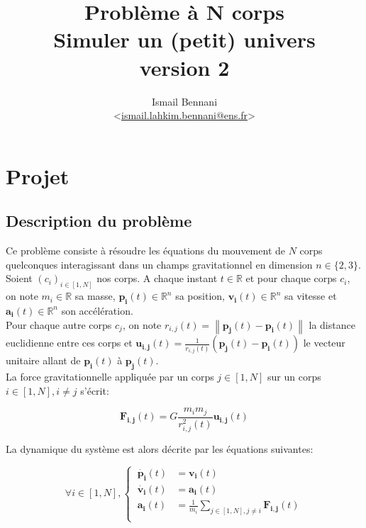 \documentclass{article}
\title{\textbf{Problème à N corps} \\
       \Large Simuler un (petit) univers\\
       \small version 2}
\author{Ismail Bennani \\
        <\href{mailto:ismail.lahkim.bennani@ens.fr}{ismail.lahkim.bennani@ens.fr}>}
\date{}
\newcommand{\norm}[1]{\left\lVert#1\right\rVert}
\newcommand{\myvec}[1]{\ensuremath{\mathbf{#1}}}
\begin{document}
\maketitle

\section{Projet}
\label{projet}

\subsection{Description du problème}
\label{description}

Ce problème consiste à résoudre les équations du mouvement de $N$ corps quelconques interagissant dans un champs gravitationnel en dimension ${n\in \{ 2,3 \}}$. \\
Soient $(c_i)_{i\in[1,N]}$ nos corps. A chaque instant $t \in \mathbb{R}$ et pour chaque corps $c_i$, on note $m_i \in \mathbb{R}$ sa masse, $\myvec{p_i}(t) \in \mathbb{R}^n$ sa position, $\myvec{v_i}(t) \in \mathbb{R}^n$ sa vitesse et $\myvec{a_i}(t) \in \mathbb{R}^n$ son accélération.\\
Pour chaque autre corps $c_j$, on note $r_{i,j}(t) = \norm{\myvec{p_j}(t) - \myvec{p_i}(t)}$ la distance euclidienne entre ces corps et $\myvec{u_{i,j}}(t) = \frac{1}{r_{i,j}(t)}(\myvec{p_j}(t)-\myvec{p_i}(t))$ le vecteur unitaire allant de $\myvec{p_i}(t)$ à $\myvec{p_j}(t)$.\\

La force gravitationnelle appliquée par un corps $j \in [1,N]$ sur un corps $i \in [1,N], i \ne j$ s'écrit:

\begin{equation*}
    \myvec{F_{i,j}}(t) = G \frac{m_im_j}{r^2_{i,j}(t)} \myvec{u_{i,j}}(t)
\end{equation*}

La dynamique du système est alors décrite par les équations suivantes:

\begin{equation*}
\forall i \in [1,N], \left\{\begin{aligned}
    \ \myvec{\dot{p_i}}(t) & = \myvec{v_i}(t) \\
    \ \myvec{\dot{v_i}}(t) & = \myvec{a_i}(t) \\
    \ \myvec{a_i}(t) & = \frac{1}{m_i} \sum_{j \in [1,N], j \ne i} \myvec{F_{i,j}}(t) \\
\end{aligned}\right.
\end{equation*}
\end{document}
